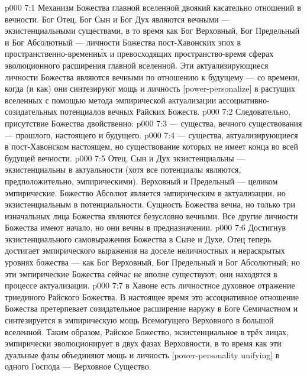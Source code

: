 \vs p000 7:1 Механизм Божества главной вселенной двоякий касательно отношений в вечности. Бог Отец, Бог Сын и Бог Дух являются вечными --- экзистенциальными существами, в то время как Бог Верховный, Бог Предельный и Бог Абсолютный ---  личности Божества пост\hyp{}Хавонских эпох в пространственно\hyp{}временн\'ых и превосходящих пространство\hyp{}время сферах эволюционного расширения главной вселенной. Эти актуализирующиеся личности Божества являются вечными по отношению к будущему --- со времени, когда (и как) они синтезируют мощь и личность [power\hyp{}personalize] в растущих вселенных с помощью метода эмпирической актуализации ассоциативно\hyp{}созидательных потенциалов вечных Райских Божеств.
\vs p000 7:2 Следовательно, присутствие Божества двойственно:
\vs p000 7:3 \bibnobreakspace {} --- существа, вечного существования --- прошлого, настоящего и будущего.
\vs p000 7:4 \bibnobreakspace {} --- существа, актуализирующиеся в пост\hyp{}Хавонском настоящем, но существование которых не имеет конца во всей будущей вечности.
\vs p000 7:5 \pc Отец, Сын и Дух экзистенциальны --- экзистенциальны в актуальности (хотя все потенциалы являются, предположительно, эмпирическими). Верховный и Предельный --- целиком эмпирические. Божество Абсолют является эмпирическим в актуализации, но экзистенциальным в потенциальности. Сущность Божества вечна, но только три изначальных лица Божества являются безусловно вечными. Все другие личности Божества имеют начало, но они вечны в предназначении.
\vs p000 7:6 Достигнув экзистенциального самовыражения Божества в Сыне и Духе, Отец теперь достигает эмпирического выражения на доселе неличностных и нераскрытых уровнях божества --- как Бог Верховный, Бог Предельный и Бог Абсолютный; но эти эмпирические Божества сейчас не вполне существуют; они находятся в процессе актуализации.
\vs p000 7:7 \pc {} в Хавоне есть личностное духовное отражение триединого Райского Божества. В настоящее время это ассоциативное отношение Божества претерпевает созидательное расширение наружу в Боге Семичастном и синтезируется в эмпирическую мощь Всемогущего Верховного в большой вселенной. Таким образом, Райское Божество, экзистенциальное в трёх лицах, эмпирически эволюционирует в двух фазах Верховности, в то время как эти дуальные фазы объединяют мощь и личность [power\hyp{}personality unifying] в одного Господа --- Верховное Существо.
